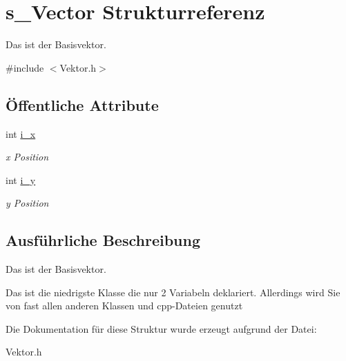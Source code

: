 \hypertarget{structs___vector}{\section{s\-\_\-\-Vector Strukturreferenz}
\label{structs___vector}
}


Das ist der Basisvektor.  




{\ttfamily \#include $<$Vektor.\-h$>$}

\subsection*{Öffentliche Attribute}
\begin{DoxyCompactItemize}
\item 
\hypertarget{structs___vector_a530003f44afc98b7ce7e51f77ef8f291}{int \hyperlink{structs___vector_a530003f44afc98b7ce7e51f77ef8f291}{i\-\_\-x}}\label{structs___vector_a530003f44afc98b7ce7e51f77ef8f291}

\begin{DoxyCompactList}\small\item\em x Position \end{DoxyCompactList}\item 
\hypertarget{structs___vector_a13bd27672ca23d2302f5c24359f67ed2}{int \hyperlink{structs___vector_a13bd27672ca23d2302f5c24359f67ed2}{i\-\_\-y}}\label{structs___vector_a13bd27672ca23d2302f5c24359f67ed2}

\begin{DoxyCompactList}\small\item\em y Position \end{DoxyCompactList}\end{DoxyCompactItemize}


\subsection{Ausführliche Beschreibung}
Das ist der Basisvektor. 

Das ist die niedrigste Klasse die nur 2 Variabeln deklariert. Allerdings wird Sie von fast allen anderen Klassen und cpp-\/\-Dateien genutzt 

Die Dokumentation für diese Struktur wurde erzeugt aufgrund der Datei\-:\begin{DoxyCompactItemize}
\item 
Vektor.\-h\end{DoxyCompactItemize}
